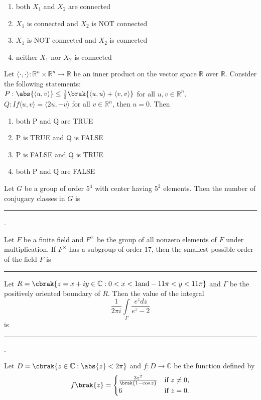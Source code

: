\begin{enumerate}
\item both $X_1$ and $X_2$ are connected
\item $X_1$ is connected and $X_2$ is NOT connected
\item $X_1$ is NOT connected and $X_2$ is connected
\item neither $X_1$ nor $X_2$ is connected
\end{enumerate}
\item Let $\langle \cdot,\cdot\rangle: \mathbb{R}^n \times \mathbb{R}^n\rightarrow\mathbb{R}$ be an inner product on the vector space $\mathbb{R}$ over $\mathbb{R}$. Consider the following statements:\\
$P: \abs{\langle u, v\rangle} \leq \frac{1}{2}\brak{\langle u, u\rangle + \langle v, v\rangle}$ for all $u, v \in \mathbb{R}^n$.\\
$Q: If \langle u, v\rangle = \langle 2u, - v\rangle$ for all $v\in\mathbb{R}^n$, then $u = 0$. Then
\begin{enumerate}
\item both P and Q are TRUE
\item P is TRUE and Q is FALSE
\item P is FALSE and Q is TRUE
\item both P and Q are FALSE
\end{enumerate}
\item Let $G$ be a group of order $5^4$ with center having $5^2$ elements. Then the number of conjugacy classes in $G$ is \rule{2cm}{0.15mm}.
\item Let $F$ be a finite field and $F^\times$ be the group of all nonzero elements of $F$ under multiplication. If $F^\times$ has a subgroup of order 17, then the smallest possible order of the field $F$ is \rule{2cm}{0.15mm}
\item Let $R= \cbrak {z = x + iy \in \mathbb{C} : 0 < x < 1 \text{and} - 11\pi < y < 11\pi }$ and $\Gamma$ be the positively oriented boundary of $R$. Then the value of the integral
$$\frac{1}{2\pi i}\int\limits_\Gamma\frac{e^z dz}{e^z -2}$$
is \rule{2cm}{0.15mm}.
\item Let $D = \cbrak {z \in \mathbb{C} : \abs{z}<2\pi}$ and $f:D\rightarrow \mathbb{C}$ be the function defined by\\
$$f\brak{z} = \begin{cases}
\frac{3z^2}{\brak{1-\cos z}} & \text{if } z \neq 0, \\
6 & \text{if } z = 0.
\end{cases}$$
